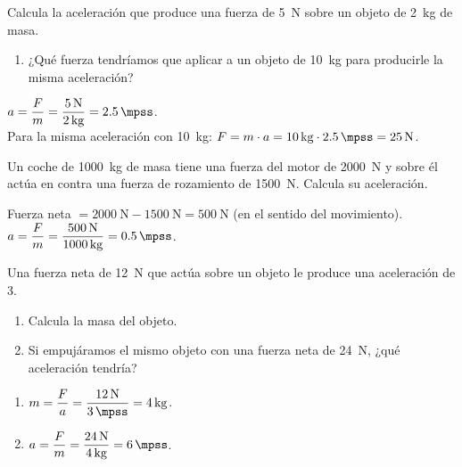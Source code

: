\begin{exercise}
    Calcula la aceleración que produce una fuerza de \qty{5}{\newton} sobre un objeto de \qty{2}{\kg} de masa.
    \begin{enumerate}[label=\letraminuscula]
        \item ¿Qué fuerza tendríamos que aplicar a un objeto de \qty{10}{\kg} para producirle la misma aceleración?
    \end{enumerate}
    \begin{solu}
        \(a = \dfrac{F}{m} = \dfrac{\qty{5}{\newton}}{\qty{2}{\kg}} = \qty{2.5}{\mpss}\). \\
        Para la misma aceleración con \qty{10}{\kg}: \(F = m \cdot a = \qty{10}{\kg} \cdot \qty{2.5}{\mpss} = \qty{25}{\newton}\).
    \end{solu}
\end{exercise}

\begin{exercise}
    Un coche de \qty{1000}{\kg} de masa tiene una fuerza del motor de \qty{2000}{\newton} y sobre él actúa en contra una fuerza de rozamiento de \qty{1500}{\newton}. Calcula su aceleración.
    \begin{solu}
        Fuerza neta \(= \qty{2000}{\newton} - \qty{1500}{\newton} = \qty{500}{\newton}\) (en el sentido del movimiento). \\
        \(a = \dfrac{F}{m} = \dfrac{\qty{500}{\newton}}{\qty{1000}{\kg}} = \qty{0.5}{\mpss}\).
    \end{solu}
\end{exercise}

\begin{exercise}
    Una fuerza neta de \qty{12}{\newton} que actúa sobre un objeto le produce una aceleración de \qty{3}{\mpss}.
    \begin{enumerate}[label=\letraminuscula]
        \item Calcula la masa del objeto.
        \item Si empujáramos el mismo objeto con una fuerza neta de \qty{24}{\newton}, ¿qué aceleración tendría?
    \end{enumerate}
    \begin{solu}
        \begin{enumerate}[label=\alph*)]
            \item \(m = \dfrac{F}{a} = \dfrac{\qty{12}{\newton}}{\qty{3}{\mpss}} = \qty{4}{\kg}\).
            \item \(a = \dfrac{F}{m} = \dfrac{\qty{24}{\newton}}{\qty{4}{\kg}} = \qty{6}{\mpss}\).
        \end{enumerate}
    \end{solu}
\end{exercise}


